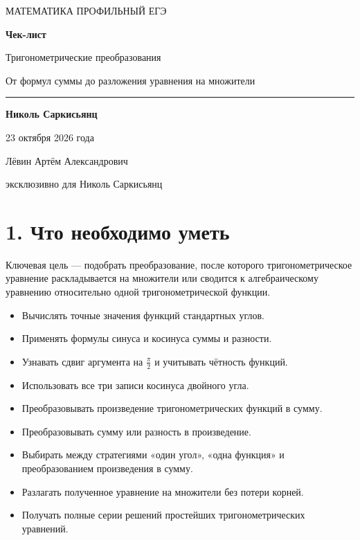 \documentclass[a4paper,12pt]{article}
\newcommand{\checkitem}{\item[$\square$]}
\newcommand{\heading}[1]{\section*{\color{darkaccent}#1}}
\begin{document}
\thispagestyle{empty}
\begin{center}
\vspace*{26mm}
{\color{accent}\Large МАТЕМАТИКА \textbullet{} ПРОФИЛЬНЫЙ ЕГЭ}\par
\vspace{18mm}
{\color{darkaccent}\fontsize{31}{37}\selectfont\bfseries Чек-лист}\par
\vspace{9mm}
{\fontsize{20}{27}\selectfont Тригонометрические преобразования}\par
\vspace{6mm}
{\large От формул суммы до разложения уравнения на множители}\par
\vspace{18mm}
{\color{accent}\rule{75mm}{0.6pt}}\par
\vspace{13mm}
{\large\bfseries Николь Саркисьянц}\par
\vspace{7mm}
{\large 23 октября 2026 года}\par
\vfill
{\normalsize Лёвин Артём Александрович}\par
{\normalsize эксклюзивно для Николь Саркисьянц}\par
\vspace{25mm}
\end{center}
\clearpage

\heading{1. Что необходимо уметь}
Ключевая цель --- подобрать преобразование, после которого тригонометрическое уравнение раскладывается на множители или сводится к алгебраическому уравнению относительно одной тригонометрической функции.

\begin{itemize}
\checkitem Вычислять точные значения функций стандартных углов.
\checkitem Применять формулы синуса и косинуса суммы и разности.
\checkitem Узнавать сдвиг аргумента на $\frac{\pi}{2}$ и учитывать чётность функций.
\checkitem Использовать все три записи косинуса двойного угла.
\checkitem Преобразовывать произведение тригонометрических функций в сумму.
\checkitem Преобразовывать сумму или разность в произведение.
\checkitem Выбирать между стратегиями «один угол», «одна функция» и преобразованием произведения в сумму.
\checkitem Разлагать полученное уравнение на множители без потери корней.
\checkitem Получать полные серии решений простейших тригонометрических уравнений.
\end{itemize}
\end{document}
